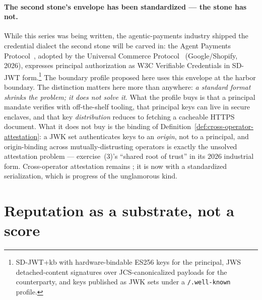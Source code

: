 \documentclass[11pt,a4paper]{article}
\theoremstyle{definition}
\begin{document}

\paragraph{The second stone's envelope has been standardized --- the stone has
not.} While this series was being written, the agentic-payments industry shipped
the credential dialect the second stone will be carved in: the Agent Payments
Protocol~, adopted by the Universal Commerce
Protocol~ (Google/Shopify, 2026), expresses principal authorization
as W3C Verifiable Credentials in SD-JWT form.\footnote{SD-JWT+kb with
hardware-bindable ES256 keys for the principal, JWS detached-content signatures
over JCS-canonicalized payloads for the counterparty, and keys published as JWK
sets under a \texttt{/.well-known} profile.} The boundary profile proposed here uses this
envelope at the harbor boundary. The distinction matters here
more than anywhere: \emph{a standard format shrinks the problem; it does not
solve it}. What the profile buys is that a principal mandate verifies with
off-the-shelf tooling, that principal keys can live in secure enclaves, and that
key \emph{distribution} reduces to fetching a cacheable HTTPS document. What it
does not buy is the binding of Definition~\ref{def:cross-operator-attestation}: a JWK set
authenticates keys to an \emph{origin}, not to a principal, and origin-binding
across mutually-distrusting operators is exactly the unsolved attestation
problem --- exercise~(3)'s ``shared root of trust'' in its 2026 industrial form.
Cross-operator attestation remains \VISION{}; it is now \VISION{} with a
standardized serialization, which is progress of the unglamorous kind.

\pdexercisepointer{\ref{ex:stp-local-vs-cross-operator}}{\ref{ex:stp-witness-log-substitute}}{\pageref{ex:stp-local-vs-cross-operator}}

\section{Reputation as a substrate, not a score}\label{sec:substrate}
\end{document}
